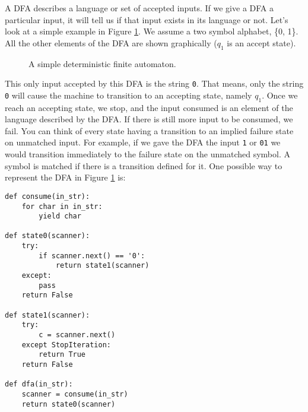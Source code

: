A DFA describes a language or set of accepted inputs.  
If we give a DFA a particular input, it will tell us if that input exists in its language or not.
Let's look at a simple example in Figure \ref{fig:simple_dfa}.  We assume a two symbol alphabet, \{0, 1\}.  All the other elements of the DFA are shown graphically ($q_1$ is an accept state).
\begin{figure}
\caption{A simple deterministic finite automaton.}
\label{fig:simple_dfa}
\end{figure}
This only input accepted by this DFA is the string \texttt{0}.
That means, only the string \texttt{0} will cause the machine to transition to an accepting state, namely $q_1$.  Once we reach an accepting state, we stop, and the input consumed is an element of the language described by the DFA.
If there is still more input to be consumed, we fail.
You can think of every state having a transition to an implied failure state on unmatched input.
For example, if we gave the DFA the input \texttt{1} or \texttt{01} we would transition immediately to the failure state on the unmatched symbol.  A symbol is matched if there is a transition defined for it.
One possible way to represent the DFA in Figure \ref{fig:simple_dfa} is:
\begin{lstlisting}
def consume(in_str):
    for char in in_str:
        yield char
    
def state0(scanner):
    try:
        if scanner.next() == '0':
            return state1(scanner)
    except:
        pass
    return False
    
def state1(scanner):
    try:
        c = scanner.next()
    except StopIteration:
        return True
    return False
    
def dfa(in_str):
    scanner = consume(in_str)
    return state0(scanner)
\end{lstlisting}


